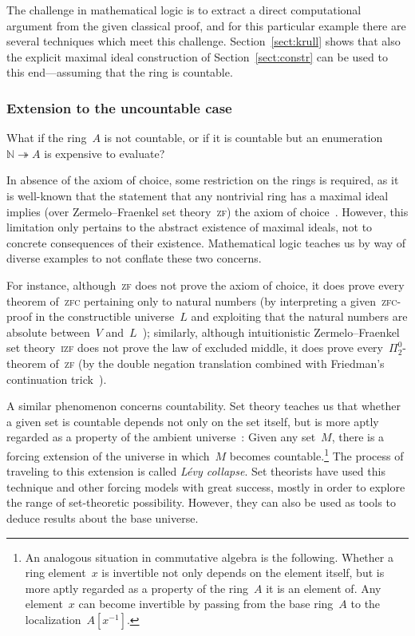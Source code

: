 \documentclass[envcountsect,envcountsame,runningheads]{llncs}
\newcommand{\NN}{\mathbb{N}}
\renewcommand{\_}{\mathpunct{.}\,}
\begin{document}
The challenge in mathematical logic is to extract a direct computational
argument from the given classical proof, and for this particular example
there are several techniques which meet this challenge. Section~\ref{sect:krull} shows that
also the explicit maximal ideal construction of Section~\ref{sect:constr} can be used to this end---assuming
that the ring is countable.


\subsubsection{Extension to the uncountable case}

What if the ring~$A$ is not countable, or if it is countable but
an enumeration~$\NN \twoheadrightarrow A$ is expensive to
evaluate?

In absence of the axiom of choice, some restriction on the
rings is required, as it is well-known that the statement that any nontrivial
ring has a maximal ideal implies (over Zermelo--Fraenkel set
theory~\textsc{zf}) the axiom of choice~\cite{scott:prime-ideals,hodges:krull,banaschewski:krull,erne:krull,howard-rubin:ac}.
However, this limitation only pertains to the abstract existence of maximal
ideals, not to concrete consequences of their existence. Mathematical
logic teaches us by way of diverse examples to not conflate these two concerns.

For
instance, although~\textsc{zf} does not prove the axiom of choice, it does
prove every theorem of~\textsc{zfc} pertaining only to natural numbers (by
interpreting a given~\textsc{zfc}-proof in the constructible universe~$L$
and exploiting that the natural numbers are absolute between~$V$
and~$L$~\cite{goedel:ac-gch,schoenfield:predicativity}); similarly, although intuitionistic Zermelo--Fraenkel set
theory~\textsc{izf} does not prove the law of excluded middle, it does prove
every~$\Pi^0_2$-theorem of~\textsc{zf} (by the double negation translation
combined with Friedman's continuation trick~\cite{friedman:double-negation-translation}).

A similar phenomenon concerns countability.
Set theory teaches us that
whether a given set is countable depends not only on the set itself, but is
more aptly regarded as a property of the ambient universe~\cite{hamkins:multiverse}: Given any
set~$M$, there is a forcing extension of the universe in which~$M$ becomes
countable.\footnote{An analogous situation in commutative algebra is the
following. Whether a ring element~$x$ is invertible not only depends
on the element itself, but is more aptly regarded as a property of the ring~$A$
it is an element of. Any element~$x$ can become invertible by passing from the
base ring~$A$ to the localization~$A[x^{-1}]$.}
The process of traveling to this extension is called \emph{Lévy collapse}. Set
theorists have used this technique and other forcing models with great success,
mostly in order to explore the range of set-theoretic possibility. However, they can
also be used as tools to deduce results about the base universe.
\end{document}
